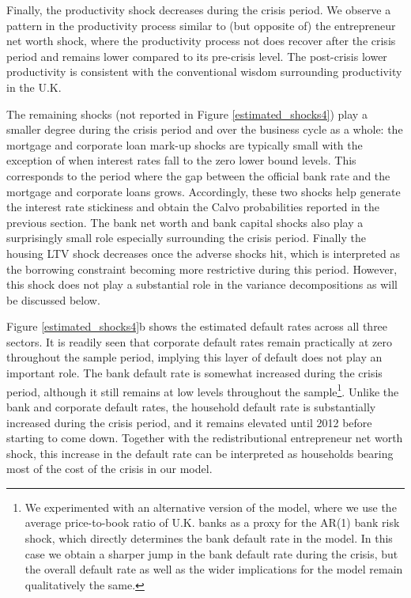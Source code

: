 \documentclass[12pt]{article}
\numberwithin{equation}{section}
\begin{document}
Finally, the productivity shock decreases during the crisis period. We observe a pattern in the productivity process similar to (but opposite of) the entrepreneur net worth shock, where the productivity process not does recover after the crisis period and remains lower compared to its pre-crisis level. The post-crisis lower productivity is consistent with the conventional wisdom surrounding productivity in the U.K. 

The remaining shocks (not reported in Figure \ref{estimated_shocks4}) play a smaller degree during the crisis period and over the business cycle as a whole: the mortgage and corporate loan mark-up shocks are typically small with the exception of when interest rates fall to the zero lower bound levels. This corresponds to the period where the gap between the official bank rate and the mortgage and corporate loans grows. Accordingly, these two shocks help generate the interest rate stickiness and obtain the Calvo probabilities reported in the previous section. The bank net worth and bank capital shocks also play a surprisingly small role especially surrounding the crisis period. Finally the housing LTV shock decreases once the adverse shocks hit, which is interpreted as the borrowing constraint becoming more restrictive during this period. However, this shock does not play a substantial role in the variance decompositions as will be discussed below. 


Figure \ref{estimated_shocks4}b shows the estimated default rates across all three sectors. It is readily seen that corporate default rates remain practically at zero throughout the sample period, implying this layer of default does not play an important role. The bank default rate is somewhat increased during the crisis period, although it still remains at low levels throughout the sample\footnote{We experimented with an alternative version of the model, where we use the average price-to-book ratio of U.K. banks as a proxy for the AR(1) bank risk shock, which directly determines the bank default rate in the model. In this case we obtain a sharper jump in the bank default rate during the crisis, but the overall default rate as well as the wider implications for the model remain qualitatively the same.}. Unlike the bank and corporate default rates, the household default rate is substantially increased during the crisis period, and it remains elevated until 2012 before starting to come down. Together with the redistributional entrepreneur net worth shock, this increase in the default rate can be interpreted as households bearing most of the cost of the crisis in our model. 
\end{document}
